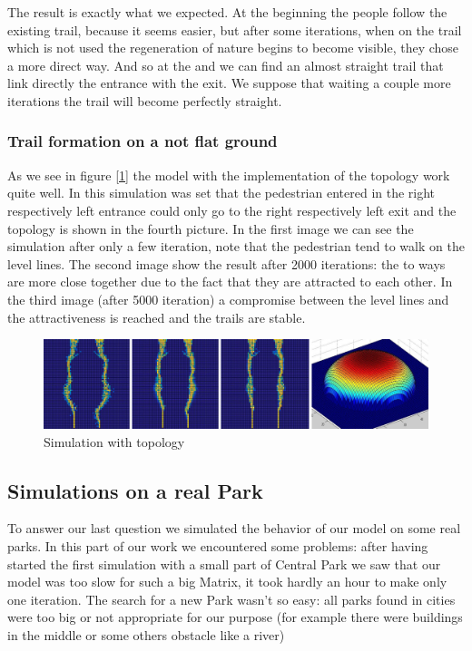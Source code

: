 \documentclass[11pt]{article}
\begin{document}
The result is exactly what we expected. At the beginning the people follow the existing trail, because it seems easier, but after some iterations, when on the trail which is not used the regeneration of nature begins to become visible, they chose a more direct way. And so at the and we can find an almost straight trail that link directly the entrance with the exit. 
We suppose that waiting a couple more iterations the trail will become perfectly straight. 

\subsubsection{Trail formation on a not flat ground}

As we see in figure [\ref{Slope}] the model with the implementation of the topology work quite well. In this simulation was set that the pedestrian entered in the right respectively left entrance could only go to the right respectively left exit and the topology is shown in the fourth picture. In the first image we can see the simulation after only a few iteration, note that the pedestrian tend to walk on the level lines. The second image show the result after 2000 iterations: the to ways are more close together due to the fact that they are attracted to each other. In the third image (after 5000 iteration) a compromise between the level lines and the attractiveness is reached and the trails are stable.

\begin{figure}[H]
\includegraphics[width=17cm]{slope.jpg}
\caption{Simulation with topology}
\label{Slope}
\end{figure}

\subsection{Simulations on a real Park}
To answer our last question we simulated the behavior of our model on some real parks. In this part of our work we encountered some problems: after having started the first simulation with a small part of Central Park we saw that our model was too slow for such a big Matrix, it took hardly an hour to make only one iteration. 
The search for a new Park wasn't so easy: all parks found in cities were too big or not appropriate for our purpose (for example there were buildings in the middle or some others obstacle like a river)
\end{document}
